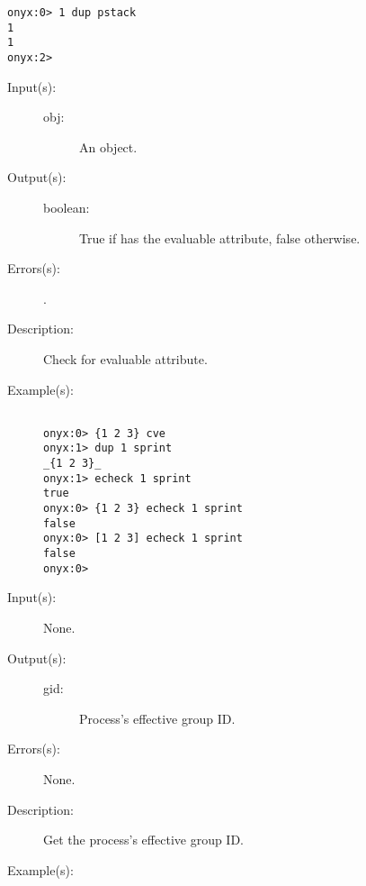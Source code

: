 \begin{description}
\begin{description}
\begin{verbatim}
onyx:0> 1 dup pstack
1
1
onyx:2>
		\end{verbatim}
	\end{description}
\label{systemdict:echeck}
\item[{\onyxop{obj}{echeck}{boolean}}: ]
	\begin{description}\item[]
	\item[Input(s): ]
		\begin{description}\item[]
		\item[obj: ]
			An object.
		\end{description}
	\item[Output(s): ]
		\begin{description}\item[]
		\item[boolean: ]
			True if  has the evaluable attribute,
			false otherwise.
		\end{description}
	\item[Errors(s): ]
		\begin{description}\item[]
		\item[.]
		\end{description}
	\item[Description: ]
		Check  for evaluable attribute.
	\item[Example(s): ]\begin{verbatim}

onyx:0> {1 2 3} cve
onyx:1> dup 1 sprint
_{1 2 3}_
onyx:1> echeck 1 sprint
true
onyx:0> {1 2 3} echeck 1 sprint
false
onyx:0> [1 2 3] echeck 1 sprint
false
onyx:0>
		\end{verbatim}
	\end{description}
\label{systemdict:egid}
\item[{\onyxop{--}{egid}{gid}}: ]
	\begin{description}\item[]
	\item[Input(s): ] None.
	\item[Output(s): ]
		\begin{description}\item[]
		\item[gid: ]
			Process's effective group ID.
		\end{description}
	\item[Errors(s): ] None.
	\item[Description: ]
		Get the process's effective group ID.
	\item[Example(s): ]\begin{verbatim}


\end{verbatim}
\end{description}
\end{description}
